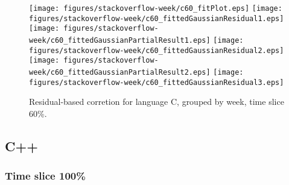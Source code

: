 \begin{figure}[t]
\centering
{}
{\texttt{[image: figures/stackoverflow-week/c60\_fitPlot.eps]}}
{\texttt{[image: figures/stackoverflow-week/c60\_fittedGaussianResidual1.eps]}}
{\texttt{[image: figures/stackoverflow-week/c60\_fittedGaussianPartialResult1.eps]}}
{\texttt{[image: figures/stackoverflow-week/c60\_fittedGaussianResidual2.eps]}}
{\texttt{[image: figures/stackoverflow-week/c60\_fittedGaussianPartialResult2.eps]}}
{\texttt{[image: figures/stackoverflow-week/c60\_fittedGaussianResidual3.eps]}}
\caption{Residual-based corretion for language C, grouped by week, time slice 60\%.}
\end{figure}


\FloatBarrier


\subsection{C++}

\subsubsection{Time slice 100\%}

